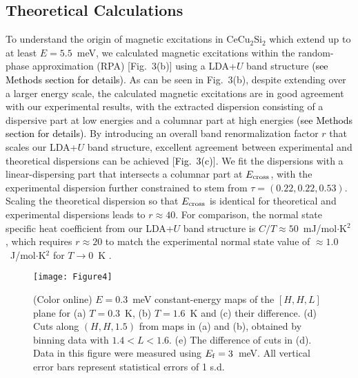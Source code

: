 \documentclass[aps,prl,onecolumn,amsmath,amssymb,superscriptaddress]{revtex4}
\newcommand{\ys}{\textcolor{black}}
\newcommand{\yy}{\textcolor{black}}
\begin{document}
\subsection{Theoretical Calculations}
To understand the origin of magnetic excitations in CeCu$_2$Si$_2$ which extend up to at least $E=5.5$~meV, we calculated magnetic excitations within the random-phase approximation (RPA) [Fig.~3(b)] using a LDA+$U$ band structure \yy{(see Methods section for details)}. As can be seen in Fig.~3(b), despite extending over a larger energy scale, the calculated magnetic excitations are in good agreement with our experimental results, with the extracted dispersion consisting of a dispersive part at low energies and a columnar part at high energies \ys{(see Methods section for details)}. By introducing an overall band renormalization factor $r$ that scales our LDA+$U$ band structure, excellent agreement between experimental and theoretical dispersions can be achieved [\ys{Fig.~3(c)}]. We fit the dispersions with a linear-dispersing part that intersects a columnar part at $E_{\rm cross}$, with the experimental dispersion further constrained to stem from $\tau=(0.22,0.22,0.53)$. Scaling the theoretical dispersion so that %
$E_{\rm cross}$ is identical for theoretical and experimental dispersions leads to $r\approx40$. For comparison, the normal state specific heat coefficient from our LDA+$U$ band structure is $C/T\approx50$~mJ/mol$\cdot$K$^2$, which requires $r\approx20$ to match the experimental normal state value of $\approx1.0$~J/mol$\cdot$K$^2$ for $T\rightarrow0$~K \cite{JArndt2011}. 

\begin{figure}[t]
	\texttt{[image: Figure4]}
	\caption{ 
		(Color online) $E=0.3$~meV constant-energy maps of the $[H,H,L]$ plane for (a) $T=0.3$~K, (b) $T=1.6$~K and (c) their difference. (d) Cuts along $(H,H,1.5)$ from maps in (a) and (b), obtained by binning data with $1.4<L<1.6$. (e) The difference of cuts in (d). Data in this figure were measured using $E_{\rm f}=3$~meV. All vertical error bars represent statistical errors of 1 s.d.
	}
\end{figure} 
\end{document}
